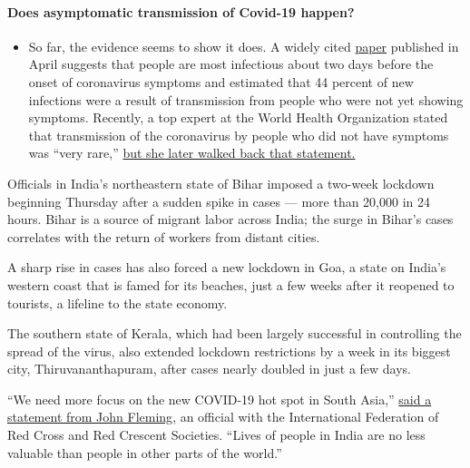 \begin{itemize}
{  \paragraph{Does asymptomatic transmission of Covid-19
  happen?}\label{does-asymptomatic-transmission-of-covid-19-happen}}

  \begin{itemize}
  \tightlist
  \item
    So far, the evidence seems to show it does. A widely cited
    \href{https://www.nature.com/articles/s41591-020-0869-5}{paper}
    published in April suggests that people are most infectious about
    two days before the onset of coronavirus symptoms and estimated that
    44 percent of new infections were a result of transmission from
    people who were not yet showing symptoms. Recently, a top expert at
    the World Health Organization stated that transmission of the
    coronavirus by people who did not have symptoms was ``very rare,''
    \href{https://www.nytimes.com/2020/06/09/world/coronavirus-updates.html?action=click\&pgtype=Article\&state=default\&region=MAIN_CONTENT_3\&context=storylines_faq\#link-1f302e21}{but
    she later walked back that statement.}
  \end{itemize}
\end{itemize}

Officials in India's northeastern state of Bihar imposed a two-week
lockdown beginning Thursday after a sudden spike in cases --- more than
20,000 in 24 hours. Bihar is a source of migrant labor across India; the
surge in Bihar's cases correlates with the return of workers from
distant cities.

A sharp rise in cases has also forced a new lockdown in Goa, a state on
India's western coast that is famed for its beaches, just a few weeks
after it reopened to tourists, a lifeline to the state economy.

The southern state of Kerala, which had been largely successful in
controlling the spread of the virus, also extended lockdown restrictions
by a week in its biggest city, Thiruvananthapuram, after cases nearly
doubled in just a few days.

``We need more focus on the new COVID-19 hot spot in South Asia,''
\href{https://media.ifrc.org/ifrc/press-release/red-cross-red-crescent-braces-covid-spike-south-asia/}{said
a statement from John Fleming}, an official with the International
Federation of Red Cross and Red Crescent Societies. ``Lives of people in
India are no less valuable than people in other parts of the world.''

